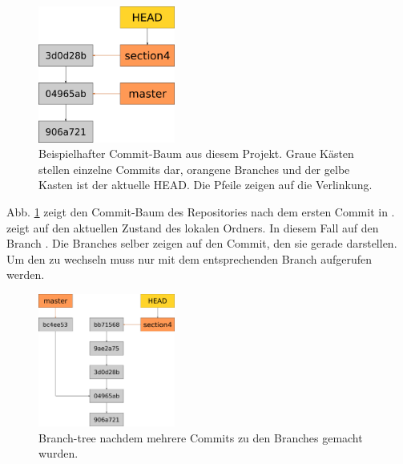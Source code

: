 \begin{figure}[!h]
	\centering
	\includegraphics[width=0.4\textwidth]{Bilder/branching.png}
	\caption{Beispielhafter Commit-Baum aus diesem Projekt. Graue Kästen stellen einzelne Commits dar, orangene Branches und der gelbe Kasten ist der aktuelle HEAD. Die Pfeile zeigen auf die Verlinkung.}
	\label{fig:branch_1}
\end{figure}
Abb. \ref{fig:branch_1} zeigt den Commit-Baum des Repositories nach dem ersten Commit in .  zeigt auf den aktuellen Zustand des lokalen Ordners. In diesem Fall auf den Branch . Die Branches selber zeigen auf den Commit, den sie gerade darstellen. Um den  zu wechseln muss nur  mit dem entsprechenden Branch aufgerufen werden.
\begin{figure}[!h]
	\centering
	\includegraphics[width=0.4\textwidth]{Bilder/branching_2.png}
	\caption{Branch-tree nachdem mehrere Commits zu den Branches gemacht wurden.}
	\label{fig:branch_2}
\end{figure}

